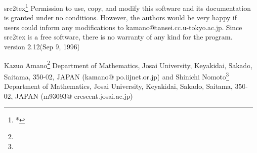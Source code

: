 
\bigskip
\bigskip

\centerline{{\twelvecmbx src2tex}\footnote{*}
		{Permission to use, copy, and modify this software and its
		documentation is granted under no conditions.
		However, the authors would be very happy if users could inform
		any modifications to kamano@tansei.cc.u-tokyo.ac.jp.
		Since src2tex is a free software,
		there is no warranty of any kind for the program.}
	\quad\rm version 2.12\quad (Sep 9, 1996)}
\bigskip

\centerline{\tencmcsc Kazuo Amano\footnote{\dag}
	{\rm Department of Mathematics,
		Josai University,
		Keyakidai, Sakado, Saitama,
		350-02,
		JAPAN
		(kamano@ po.iijnet.or.jp)}
	and Shinichi Nomoto\footnote{\ddag}
	{\rm Department of Mathematics,
		Josai University,
		Keyakidai, Sakado, Saitama,
		350-02,
		JAPAN
		(m93093@ crescent.josai.ac.jp)}}

\bigskip
\bigskip
